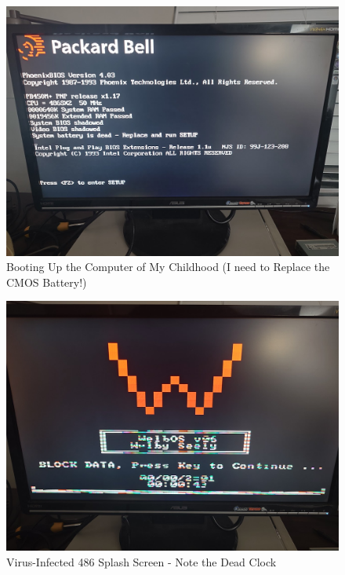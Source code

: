 \documentclass{article}
\begin{document}
    \begin{figure}[H]
        \centering
        \includegraphics[width=\textwidth]{packard-bell} %
        \caption{Booting Up the Computer of My Childhood (I need to Replace the CMOS Battery!)}
        \label{fig:3}
    \end{figure}

    \begin{figure}[H]
        \centering
        \includegraphics[width=\textwidth]{packard-splash} %
        \caption{Virus-Infected 486 Splash Screen - Note the Dead Clock}
        \label{fig:4}
    \end{figure}
\end{document}
